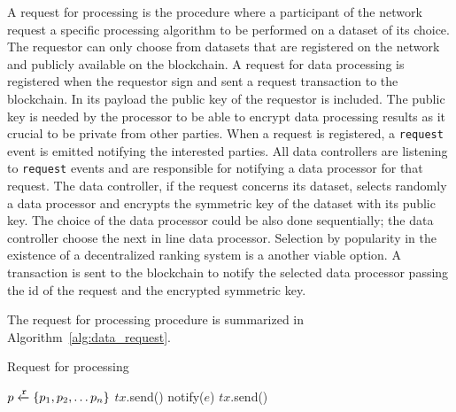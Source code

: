 A request for processing is the procedure where a participant of the network request a specific processing algorithm to be performed on a dataset of its choice. The requestor can only choose from datasets that are registered on the network and publicly available on the blockchain. A request for data processing is registered when the requestor sign and sent a request transaction to the blockchain. In its payload the public key of the requestor is included. The public key is needed by the processor to be able to encrypt data processing results as it crucial to be private from other parties. When a request is registered, a \verb|request| event is emitted notifying the interested parties. All data controllers are listening to \verb|request| events and are responsible for notifying a data processor for that request. The data controller, if the request concerns its dataset, selects randomly a data processor and encrypts the symmetric key of the dataset with its public key. The choice of the data processor could be also done sequentially; the data controller choose the next in line data processor. Selection by popularity in the existence of a decentralized ranking system is a another viable option. A transaction is sent to the blockchain to notify the selected data processor passing the id of the request and the encrypted symmetric key.

The request for processing procedure is summarized in Algorithm~\ref{alg:data_request}.

\begin{algorithm}[!htb]
  \caption{Request for processing}\label{alg:data_request}
  \begin{algorithmic}[1]
    \State $p \xleftarrow{\mathtt{r}} \{ p_1, p_2, \dots p_n \}$ 
     
     
     
    \State $tx$.send()
    \State {}
  \EndFunction
     
        \State notify($e$) 
      \EndIf
    \EndWhile
  \EndProcedure
     
    \State $tx$.send()
    \State {}
  \EndProcedure
  \end{algorithmic}
\end{algorithm}

